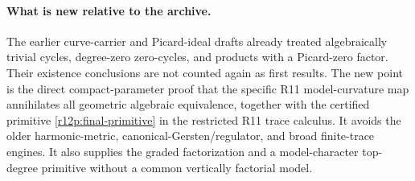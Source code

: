 \paragraph{What is new relative to the archive.}
The earlier curve-carrier and Picard-ideal drafts already treated
algebraically trivial cycles, degree-zero zero-cycles, and products
with a Picard-zero factor.  Their existence conclusions are not
counted again as first results.  The new point is the direct
compact-parameter proof that the specific R11 model-curvature map
annihilates all geometric algebraic equivalence, together with the
certified primitive \eqref{r12p:final-primitive} in the restricted
R11 trace calculus.  It avoids the older harmonic-metric,
canonical-Gersten/regulator, and broad finite-trace engines.  It
also supplies the graded factorization and a model-character
top-degree primitive without a common vertically factorial model.
